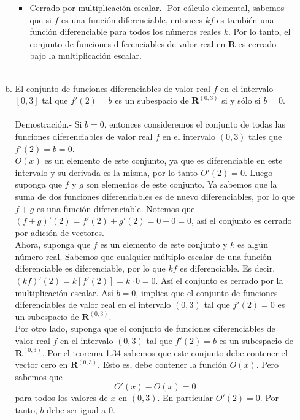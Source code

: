 \begin{enumerate}[\bfseries 1.]
\begin{enumerate}[(a)]
\begin{itemize}
		    \item Cerrado por multiplicación escalar.-\; Por cálculo elemental, sabemos que si $f$ es una función diferenciable, entonces $kf$ es también una función diferenciable para todos los números reales $k$. Por lo tanto, el conjunto de funciones diferenciables de valor real en $\textbf{R}$ es cerrado bajo la multiplicación escalar.\\\\
		\end{itemize}

	    \item El conjunto de funciones diferenciables de valor real $f$ en el intervalo $[0,3]$ tal que $f'(2)=b$ es un subespacio de $\textbf{R}^{(0,3)}$ si y sólo si $b=0$.\\\\
		Demostración.-\; Si $b=0$, entonces consideremos el conjunto de todas las funciones diferenciables de valor real $f$ en el intervalo $(0,3)$ tales que $f'(2)=b=0$.\\
		$O(x)$ es un elemento de este conjunto, ya que es diferenciable en este intervalo y su derivada es la misma, por lo tanto $O'(2)=0$. Luego suponga que $f$ y $g$ son elementos de este conjunto. Ya sabemos que la suma de dos funciones diferenciables es de nuevo diferenciables, por lo que $f+g$ es una función diferenciable. Notemos que $(f+g)'(2)=f'(2)+g'(2)=0+0=0$, así el conjunto es cerrado por adición de vectores.\\
		Ahora, suponga que $f$ es un elemento de este conjunto y $k$ es algún número real. Sabemos que cualquier múltiplo escalar de una función diferenciable es diferenciable, por lo que $kf$ es diferenciable. Es decir, $(kf)'(2)=k\left[f'(2)\right]=k\cdot 0 = 0.$ Así el conjunto es cerrado por la multiplicación escalar. Así $b=0$, implica que el conjunto de funciones diferenciables de valor real en el intervalo $(0,3)$ tal que $f'(2)=0$ es un subespacio de $\textbf{R}^{(0,3)}$.\\
		Por otro lado, suponga que el conjunto de funciones diferenciables de valor real $f$ en el intervalo $(0,3)$ tal que $f'(2)=b$ es un subespacio de $\textbf{R}^{(0,3)}$. Por el teorema 1.34 sabemos que este conjunto debe contener el vector cero en $\textbf{R}^{(0,3)}$. Esto es, debe contener la función $O(x)$. Pero sabemos que
		$$O'(x)-O(x)=0$$
		para todos los valores de $x$ en $(0,3)$. En particular $O'(2)=0$. Por tanto, $b$ debe ser igual a $0$.\\\\


\end{enumerate}
\end{enumerate}
